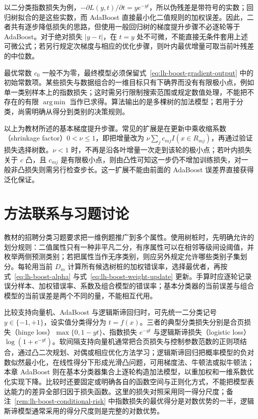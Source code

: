 以二分类指数损失为例，$-\partial L(y,t)/\partial t=ye^{-yt}$，所以伪残差是带符号的实数；回归树拟合的是这些实数，而 AdaBoost 直接最小化二值规则的加权误差。因此，二者共有逐步降低损失的思路，但使用一般回归树的梯度提升步骤不必逐轮等于 AdaBoost。对于绝对损失 $|y-t|$，在 $t=y$ 处不可微，不能直接无条件套用上述可微公式；若另行规定次梯度与相应的优化步骤，则叶内最优增量可取当前叶残差的中位数。

\begin{notealert}[type=caution,title={初始化、有限极小点与输出形式}]
最优常数 $c_0$ 一般不为零，最终模型必须保留式~\eqref{eq:lh-boost-gradient-output} 中的初始常数项。某些损失与数据组合的一维目标只有下确界而没有有限极小点，例如单一类别样本上的指数损失；这时需另行限制搜索范围或规定数值处理，不能把不存在的有限 $\operatorname*{arg\,min}$ 当作已求得。算法输出的是多棵树的加法模型；若用于分类，尚需明确从得分到类别的决策规则。
\end{notealert}

以上为教材所述的基本梯度提升步骤。常见的扩展是在更新中乘收缩系数（shrinkage factor）$0<\nu\leq1$，即把增量改为 $\nu\sum_jc_{mj}I(x\in R_{mj})$，再通过验证损失选择树数。$\nu<1$ 时，不再是沿各叶增量一次走到该轮的极小点；若叶内损失关于 $c$ 凸，且 $c_{mj}$ 是有限极小点，则由凸性可知这一步仍不增加训练损失，对一般非凸损失则需另行检查步长。这一扩展不能由前面的 AdaBoost 误差界直接获得泛化保证。

\section{方法联系与习题讨论}
\label{sec:lh-boost-review}

教材的招聘分类习题要求把一维例题推广到多个属性。使用树桩时，先明确允许的划分规则：二值属性只有一种非平凡二分，有序属性可以在相邻等级间设阈值，并枚举两侧预测类别；若把属性当作无序类别，则应另外规定允许哪些类别子集划分。每轮用当前 $D_m$ 计算所有候选树桩的加权错误率，选择最优者，再按式~\eqref{eq:lh-boost-alpha} 与式~\eqref{eq:lh-boost-weight-update} 更新。手算时应逐轮记录误分样本、加权错误率、系数及组合模型的错误率；基本分类器的当前误差与组合模型的当前误差是两个不同的量，不能相互代用。

比较支持向量机、AdaBoost 与逻辑斯谛回归时，可先统一二分类记号 $y\in\{-1,+1\}$，设实值分类得分为 $t=f(x)$。三者的典型分类损失分别是合页损失（hinge loss）$\max\{0,1-yt\}$、指数损失 $e^{-yt}$ 与逻辑斯谛损失（logistic loss）$\log(1+e^{-yt})$。软间隔支持向量机通常把合页损失与控制参数范数的正则项结合，通过凸二次规划、对偶或相应优化方法学习；逻辑斯谛回归把概率模型的负对数似然最小化，在线性得分下形成光滑凸问题，可用梯度法、牛顿法或拟牛顿法；本章 AdaBoost 则在基本分类器集合上逐轮构造加法模型，以重加权和一维系数优化实现下降。比较时还要固定或明确各自的函数空间与正则化方式，不能把模型表达能力的差异全部归因于损失函数。这里的损失对照采用同一得分尺度；备注~\ref{rem:lh-boost-conditional-risk} 中指数损失的最优得分是对数优势的一半，逻辑斯谛模型通常采用的得分尺度则是完整的对数优势。

